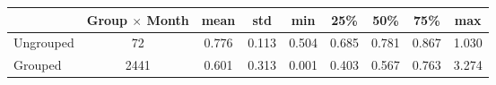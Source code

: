 \begin{tabular}{lcccccccc}
\toprule
{} &  Group $ \times$ Month &   mean &    std &    min &    25\% &    50\% &    75\% &    max \\
\midrule
Ungrouped &                      72 &  0.776 &  0.113 &  0.504 &  0.685 &  0.781 &  0.867 &  1.030 \\
Grouped   &                    2441 &  0.601 &  0.313 &  0.001 &  0.403 &  0.567 &  0.763 &  3.274 \\
\bottomrule
\end{tabular}
